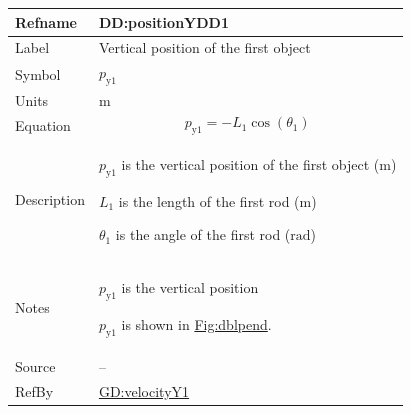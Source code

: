 \documentclass[12pt]{article}
\begin{document}
\begin{minipage}{\textwidth}
\begin{tabular}{>{\raggedright}p{}>{\raggedright\arraybackslash}p{}}
\toprule \textbf{Refname} & \textbf{DD:positionYDD1}
\label{DD:positionYDD1}
\\ \midrule
Label & Vertical position of the first object
        
\\ \midrule
Symbol & ${p_{\text{y}1}}$
         
\\ \midrule
Units & ${\text{m}}$
        
\\ \midrule
Equation & \begin{displaymath}
           {p_{\text{y}1}}=-{L_{1}} \cos\left({θ_{1}}\right)
           \end{displaymath}
\\ \midrule
Description & \begin{symbDescription}
              \item{${p_{\text{y}1}}$ is the vertical position of the first object (${\text{m}}$)}
              \item{${L_{1}}$ is the length of the first rod (${\text{m}}$)}
              \item{${θ_{1}}$ is the angle of the first rod (${\text{rad}}$)}
              \end{symbDescription}
\\ \midrule
Notes & ${p_{\text{y}1}}$ is the vertical position
        
        ${p_{\text{y}1}}$ is shown in \hyperref[Figure:dblpend]{Fig:dblpend}.
        
\\ \midrule
Source & --
         
\\ \midrule
RefBy & \hyperref[GD:velocityY1]{GD:velocityY1}
        
\\ \bottomrule
\end{tabular}
\end{minipage}
\vspace{\baselineskip}
\noindent
\end{document}
